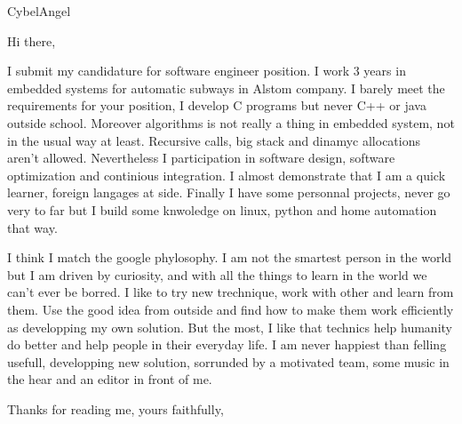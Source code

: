\documentclass[11pt]{lettre}
\makeatletter
\newcommand*{\NoRule}{\renewcommand*{\rule@length}{0}}
\makeatother
\begin{document}
\begin{letter}{CybelAngel}

  \def\concname{Objet :~}


  \signature{Hoel IRIS}
  \address{Hoel IRIS\\
  54 avenue Mathurin Moreau\\
  75019 Paris\\
  Tel : 06 18 39 30 11\\
  E-Mail : hoel.iris@gmail.com}
  \NoRule
  \notelephone
  \nofax
    \opening{Hi there,}
      
      I submit my candidature for software engineer position.
      I work 3 years in embedded systems for automatic subways in Alstom company.
      I barely meet the requirements for your position, I develop C programs but never C++ or java outside school.
      Moreover algorithms is not really a thing in embedded system, not in the usual way at least. Recursive calls, big stack and dinamyc allocations aren't allowed. 
      Nevertheless I participation in software design, software optimization and continious integration.  
      I almost demonstrate that I am a quick learner, foreign langages at side.
      Finally I have some personnal projects, never go very to far but I build some knwoledge on linux, python and home automation that way.
       
      I think I match the google phylosophy. I am not the smartest person in the world but I am driven by curiosity, and with all the things to learn in the world we can't ever be borred.
      I like to try new trechnique, work with other and learn from them. Use the good idea from outside and find how to make them work efficiently as developping my own solution.
      But the most, I like that technics help humanity do better and help people in their everyday life.
      I am never happiest than felling usefull, developping new solution, sorrunded by a motivated team, some music in the hear and an editor in front of me.
          
    \closing{Thanks for reading me, yours faithfully,}
    
 
\end{letter}
 
\end{document}
